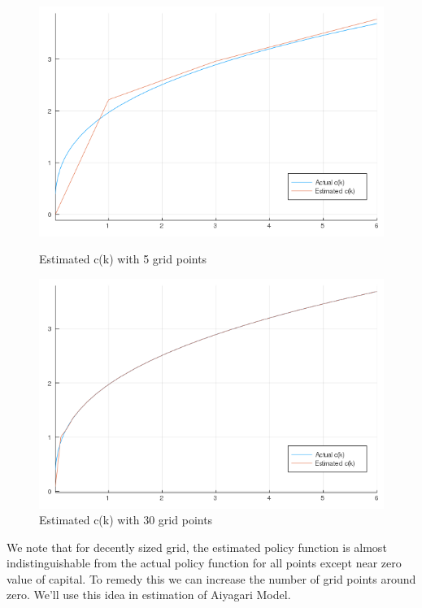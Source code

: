 \documentclass[12pt]{article}
\begin{document}
\begin{figure}[h]
    \centering
    \begin{minipage}{0.45\textwidth}
        \centering
        \includegraphics[width=1\textwidth]{c_policy_5grid.png} %
        \caption{Estimated c(k) with 5 grid points}
    \end{minipage}\hfill
    \begin{minipage}{0.45\textwidth}
        \centering
        \includegraphics[width=1\textwidth]{c_policy_30grid.png} %
        \caption{Estimated c(k) with 30 grid points}
    \end{minipage}
\end{figure}

We note that for decently sized grid, the estimated policy function is almost indistinguishable from the actual policy function for all points except near zero value of capital. To remedy this we can increase the number of grid points around zero. We'll use this idea in estimation of Aiyagari Model.
\end{document}
